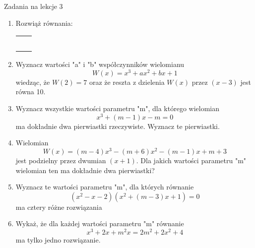 \documentclass[12pt,a4paper]{article}
\begin{document}
	
	\begin{center}
		\LARGE Zadania na lekcje 3
	\end{center}
	\vspace{1.5cm}
	
	\begin{enumerate}[1.]
		\item Rozwiąż równania:
		\begin{enumerate}[a)] \begin{tabular}{p{7cm} p{7cm}} 
				\item $x^5+5x^4-14x^3=0$ & \vspace{0.4cm} 	\item$\sqrt{2}x^3+2x^2-4\sqrt{2}x=0$ \\
				\item $x^3+4x^2+8x+32=0$ & \item $x^6-7x^3-8=0$ \\
				\item $x^5+4x^3-8x^2-32=0$& \item $x^3+9x^2+27x=-31$ \\
				\item $x^3+x-2=0$& \item $x^4-3x^3-14x^2-20x-24=0$ \\
				\item $4x^3+2x^2-8x+3=0$& \item $6x^3-13x^2+9x-2=0$ \\
		\end{tabular} \end{enumerate}
		
		\item Wyznacz wartości "a" i "b" współczynników wielomianu 
		$$W(x)=x^3+ax^2+bx+1$$
		wiedząc, że $W(2)=7$ oraz że reszta z dzielenia $W(x)$ przez $(x-3)$ jest równa 10.
		
		\item Wyznacz wszystkie wartości parametru "m", dla którego wielomian
		$$x^3+(m-1)x-m=0$$
		ma dokładnie dwa pierwiastki rzeczywiste. Wyznacz te pierwiastki.
		
		\item Wielomian
		$$W(x)=(m-4)x^3-(m+6)x^2-(m-1)x+m+3$$
		jest podzielny przez dwumian $(x+1)$. Dla jakich wartości parametru "m" wielomian ten ma dokładnie dwa pierwiastki?
		
		\item Wyznacz te wartości parametru "m", dla których równanie
		$$(x^2-x-2)(x^2+(m-3)x+1)=0$$
		ma cztery różne rozwiązania
		\item Wykaż, że dla każdej wartości parametru "m" równanie
		$$x^3+2x+m^2x=2m^2+2x^2+4$$
		ma tylko jedno rozwiązanie.
		
	\end{enumerate}
	
\end{document}
